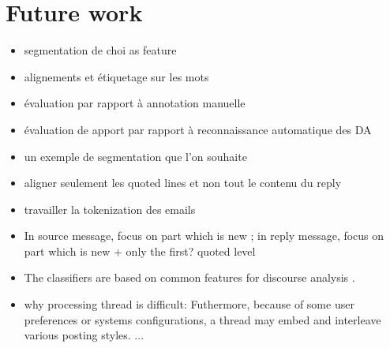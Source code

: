

\section{Future work}
\label{sec:futureWork}

\begin{itemize}
\item segmentation de choi as feature
\item alignements et étiquetage sur les mots
\item évaluation par rapport à annotation manuelle
\item évaluation de apport par rapport à reconnaissance automatique des DA 
\item un exemple de segmentation que l'on souhaite
\item aligner seulement les quoted lines et non tout le contenu du reply
\item travailler la tokenization des emails
\item In source message, focus on part which is new ; in reply message, focus on part which is new + only the first? quoted level 
\item The classifiers are based on common features for discourse analysis \cite{joty:2013:acl}.
\item why processing thread is difficult: Futhermore, because of some user preferences or systems configurations, a thread may embed and interleave various posting styles.  ...
 
\end{itemize}
